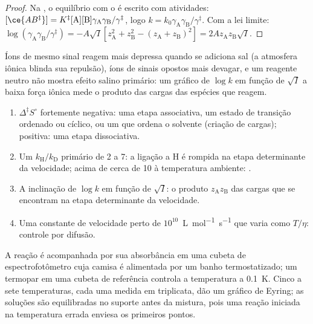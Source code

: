 \begin{proof}
Na , o equilíbrio com o  é escrito
com atividades: $[\ce{AB^{\ddagger}}] = K^{\ddagger}[\mathrm A][\mathrm B]\gamma_{\mathrm A}\gamma_{\mathrm B}/\gamma^{\ddagger}$, logo $k = k_0\gamma_{\mathrm A}\gamma_{\mathrm B}/\gamma^{\ddagger}$.
Com a lei limite: $\log(\gamma_{\mathrm A}\gamma_{\mathrm B}/\gamma^{\ddagger}) = -A\sqrt I[z_{\mathrm A}^2 + z_{\mathrm B}^2 - (z_{\mathrm A} + z_{\mathrm B})^2] =
2Az_{\mathrm A}z_{\mathrm B}\sqrt I$.
\end{proof}

Íons de mesmo sinal reagem mais depressa quando se adiciona sal (a atmosfera
iônica blinda sua repulsão), íons de sinais opostos mais devagar, e um reagente
neutro não mostra efeito salino primário: um gráfico de $\log k$ em função de
$\sqrt I$ a baixa força iônica mede o produto das cargas das espécies que reagem.

\begin{method}\label{met:b3:rate-theories:mechanism-evidence}
\begin{enumerate}
  \item $\Delta^{\ddagger}S^\circ$ fortemente negativa: uma etapa associativa, um estado de
        transição ordenado ou cíclico, ou um que ordena o solvente (criação de cargas);
        positiva: uma etapa dissociativa.
  \item Um $k_{\mathrm H}/k_{\mathrm D}$ primário de 2 a 7: a ligação a H é rompida na etapa
        determinante da velocidade; acima de cerca de 10 à temperatura ambiente: .
  \item A inclinação de $\log k$ em função de $\sqrt I$: o produto $z_{\mathrm A}z_{\mathrm B}$ das cargas
        que se encontram na etapa determinante da velocidade.
  \item Uma constante de velocidade perto de $10^{10}$~\unit{L.mol^{-1}.s^{-1}} que varia como $T/\eta$:
        controle por difusão.
\end{enumerate}
\end{method}

\begin{inthelab}
A reação é acompanhada por sua absorbância em uma cubeta de espectrofotômetro
cuja camisa é alimentada por um banho termostatizado; um termopar em uma cubeta
de referência controla a temperatura a \qty{0.1}{K}. Cinco a sete temperaturas,
cada uma medida em triplicata, dão um gráfico de Eyring; as soluções são
equilibradas no suporte antes da mistura, pois uma reação iniciada na
temperatura errada enviesa os primeiros pontos.
\end{inthelab}

